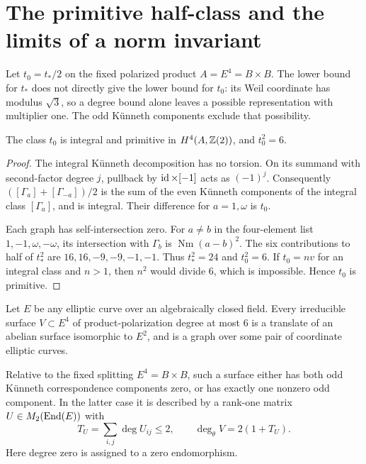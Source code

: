 \section{The primitive half-class and the limits of a norm invariant}
\label{sec:primitive-weil}

Let $t_0=t_*/2$ on the fixed polarized product $A=E^4=B\times B$.
The lower bound for $t_*$ does not directly give the lower bound for
$t_0$: its Weil coordinate has modulus $\sqrt3$, so a degree bound alone
leaves a possible representation with multiplier one. The odd K\"unneth
components exclude that possibility.

\begin{lemma}
The class $t_0$ is integral and primitive in $H^4(A,\mathbb Z(2))$, and
$t_0^2=6$.
\end{lemma}

\begin{proof}
The integral K\"unneth decomposition has no torsion. On its summand with
second-factor degree $j$, pullback by $\operatorname{id}\times[-1]$ acts as $(-1)^j$.
Consequently
$([\Gamma_a]+[\Gamma_{-a}])/2$ is the sum of the even K\"unneth
components of the integral class $[\Gamma_a]$, and is integral.
Their difference for $a=1,\omega$ is $t_0$.

Each graph has self-intersection zero. For $a\ne b$ in the four-element
list $1,-1,\omega,-\omega$, its intersection with $\Gamma_b$ is
$\operatorname{Nm}(a-b)^2$. The six contributions to half of $t_*^2$
are $16,16,-9,-9,-1,-1$. Thus $t_*^2=24$ and $t_0^2=6$.
If $t_0=n v$ for an integral class and $n>1$, then $n^2$ would divide $6$,
which is impossible. Hence $t_0$ is primitive.
\end{proof}

\begin{lemma}
Let $E$ be any elliptic curve over an algebraically closed field.
Every irreducible surface $V\subset E^4$ of product-polarization degree
at most $6$ is a translate of an abelian surface isomorphic to $E^2$,
and is a graph over some pair of coordinate elliptic curves.

Relative to the fixed splitting $E^4=B\times B$, such a surface either
has both odd K\"unneth correspondence components zero, or has exactly
one nonzero odd component. In the latter case it is described by a
rank-one matrix $U\in M_2(\operatorname{End}(E))$ with
\[
 T_U=\sum_{i,j}\deg U_{ij}\leq2,
 \qquad \deg_\theta V=2(1+T_U).
\]
Here degree zero is assigned to a zero endomorphism.
\end{lemma}


